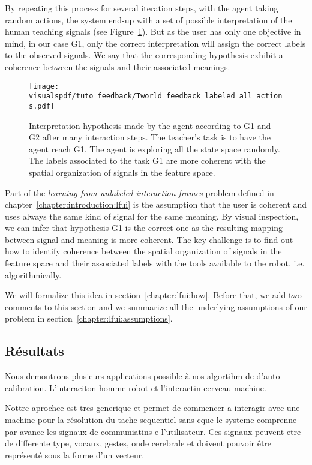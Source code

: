 By repeating this process for several iteration steps, with the agent taking random actions, the system end-up with a set of possible interpretation of the human teaching signals (see Figure~\ref{fig:TworldLabelinterpretation}). But as the user has only one objective in mind, in our case G1, only the correct interpretation will assign the correct labels to the observed signals. We say that the corresponding hypothesis exhibit a coherence between the signals and their associated meanings. 

\begin{figure}[!htbp]
    \centering
    \texttt{[image: \\visualspdf/tuto\_feedback/Tworld\_feedback\_labeled\_all\_actions.pdf]}
    \caption{Interpretation hypothesis made by the agent according to G1 and G2 after many interaction steps. The teacher's task is to have the agent reach G1. The agent is exploring all the state space randomly. The labels associated to the task G1 are more coherent with the spatial organization of signals in the feature space.}
    \label{fig:TworldLabelinterpretation}
\end{figure}

Part of the \emph{learning from unlabeled interaction frames} problem defined in chapter~\ref{chapter:introduction:lfui} is the assumption that the user is coherent and uses always the same kind of signal for the same meaning. By visual inspection, we can infer that hypothesis G1 is the correct one as the resulting mapping between signal and meaning is more coherent. The key challenge is to find out how to identify coherence between the spatial organization of signals in the feature space and their associated labels with the tools available to the robot, i.e. algorithmically. 

We will formalize this idea in section~\ref{chapter:lfui:how}. Before that, we add two comments to this section and we summarize all the underlying assumptions of our problem in section~\ref{chapter:lfui:assumptions}.

\subsection*{Résultats}

Nous demontrons plusieurs applications possible à nos algortihm de d'auto-calibration. L'interaciton homme-robot et l'interactin cerveau-machine. 

Nottre aprochce est tres generique et permet de commencer a interagir avec une machine pour la résolution du tache sequentiel sans cque le systeme comprenne par avance les signaux de communiatins e l'utilisateur. Ces signaux peuvent etre de differente type, vocaux, gestes, onde cerebrale et doivent pouvoir être représenté sous la forme d'un vecteur.


